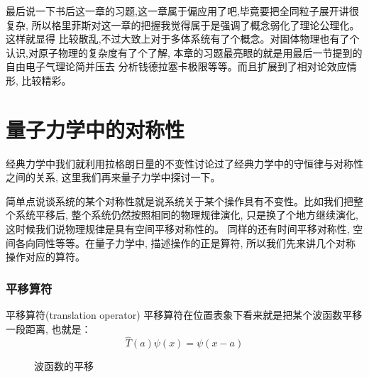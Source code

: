 \documentclass[a4paper,zihao=-4,linespread=1]{ctexrep}
\begin{document}
    最后说一下书后这一章的习题,这一章属于偏应用了吧,毕竟要把全同粒子展开讲很复杂, 所以格里菲斯对这一章的把握我觉得属于是强调了概念弱化了理论公理化。这样就显得
    比较散乱,不过大致上对于多体系统有了个概念。对固体物理也有了个认识,对原子物理的复杂度有了个了解, 本章的习题最亮眼的就是用最后一节提到的自由电子气理论简并压去
    分析钱德拉塞卡极限等等。而且扩展到了相对论效应情形, 比较精彩。


    \chapter{量子力学中的对称性}
    经典力学中我们就利用拉格朗日量的不变性讨论过了经典力学中的守恒律与对称性之间的关系, 这里我们再来量子力学中探讨一下。

    简单点说谈系统的某个对称性就是说系统关于某个操作具有不变性。比如我们把整个系统平移后, 整个系统仍然按照相同的物理规律演化, 只是换了个地方继续演化, 这时候我们说物理规律是具有空间平移对称性的。
    同样的还有时间平移对称性, 空间各向同性等等。在量子力学中, 描述操作的正是算符, 所以我们先来讲几个对称操作对应的算符。
    \subsection*{平移算符}
    \begin{define}{平移算符(translation operator)}
        平移算符在位置表象下看来就是把某个波函数平移一段距离, 也就是：
        \begin{equation}
            \boxed{\hat{T}(a)\psi(x)=\psi(x-a)}
        \end{equation}
    \end{define}
    \begin{figure}[htbp]
        \centering
        \caption{波函数的平移}
    \end{figure}
\end{document}
